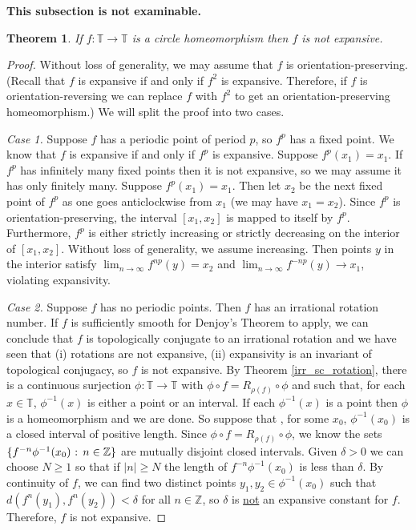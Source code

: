 \documentclass[12pt]{article}
\newtheorem{theorem}{Theorem}[section]
\theoremstyle{definition}
\theoremstyle{remark}
\begin{document}
\noindent
{\bf This subsection is not examinable.}

\begin{theorem}
If $f : \mathbb T \to \mathbb T$ is a circle homeomorphism then $f$ is not expansive.
\end{theorem}

\begin{proof}
Without loss of generality, we may assume that $f$ is orientation-preserving.
(Recall that $f$ is expansive if and only if $f^2$ is expansive. Therefore, if $f$ is orientation-reversing we can replace $f$ with $f^2$ to get an orientation-preserving homeomorphism.)
We will split the proof into two cases.

\medskip
\noindent
{\it Case 1.} Suppose $f$ has a periodic point of period $p$, so $f^p$ has a fixed point.
We know that $f$ is expansive if and only if $f^p$ is expansive. Suppose $f^p(x_1)=x_1$.
If $f^p$ has infinitely many fixed points then it is not expansive, so we may assume it has only finitely many. Suppose $f^p(x_1)=x_1$. Then let $x_2$ be the next fixed point of $f^p$
as one goes anticlockwise from $x_1$ (we may have $x_1=x_2$).
Since $f^p$ is orientation-preserving, the interval $[x_1,x_2]$ is mapped to itself by $f^p$.
Furthermore, $f^p$ is either strictly increasing or strictly decreasing on the interior of $[x_1,x_2]$.
Without loss of generality, we assume increasing.
Then points $y$ in the interior satisfy
 $\lim_{n \to \infty}f^{np}(y) =x_2$ and $\lim_{n \to \infty} f^{-np}(y) \to x_1$, violating expansivity.
 
 \medskip
 \noindent
 {\it Case 2.} Suppose $f$ has no periodic points. Then $f$ has an irrational rotation number. 
 If $f$ is sufficiently smooth for Denjoy's Theorem to apply, we can conclude that $f$ is topologically
 conjugate to an irrational rotation and we have seen that (i) rotations are not expansive, (ii)
 expansivity is an invariant of topological conjugacy, so $f$ is not expansive. 
 By Theorem \ref{irr_sc_rotation},
 there is a continuous surjection $\phi :\mathbb T \to \mathbb T$ with $\phi \circ f = R_{\rho(f)}
 \circ \phi$ and such that, for each $x \in \mathbb T$, $\phi^{-1}(x)$ is either a point or an interval.
 If each $\phi^{-1}(x)$ is a point then $\phi$ is a homeomorphism and we are done. 
 So suppose that , for some $x_0$, $\phi^{-1}(x_0)$ is a closed interval of positive length.
 Since $\phi \circ f = R_{\rho(f)} \circ \phi$, we know the sets
 $\{f^{-n}\phi^{-1}(x_0) \hbox{ : } n \in \mathbb Z\}$ are mutually disjoint closed intervals.
 Given $\delta>0$ we can choose $N \ge 1$ so that if $|n|\ge N$ the length of 
 $f^{-n} \phi^{-1}(x_0)$ is less than $\delta$.
 By continuity of $f$, we can find two distinct points $y_1,y_2 \in \phi^{-1}(x_0)$ such that
 $d(f^n(y_1),f^n(y_2)) < \delta$ for all $n \in \mathbb Z$, so $\delta$ is \underline{not}
 an expansive constant for $f$. Therefore, $f$ is not expansive.
\end{proof}
\end{document}
